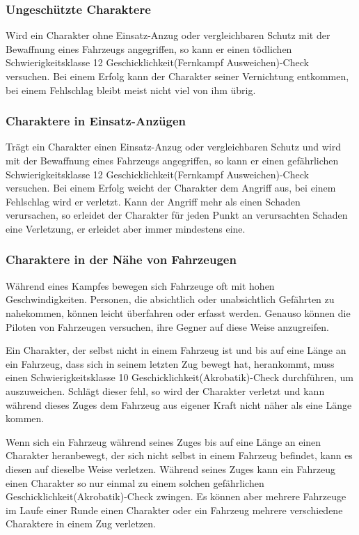 \subsubsection{Ungeschützte Charaktere}
Wird ein Charakter ohne Einsatz-Anzug oder vergleichbaren Schutz mit der Bewaffnung eines Fahrzeugs angegriffen, so kann er einen tödlichen Schwierigkeitsklasse 12 Geschicklichkeit(Fernkampf Ausweichen)-Check versuchen. Bei einem Erfolg kann der Charakter seiner Vernichtung entkommen, bei einem Fehlschlag bleibt meist nicht viel von ihm übrig.
\subsubsection{Charaktere in Einsatz-Anzügen}
Trägt ein Charakter einen Einsatz-Anzug oder vergleichbaren Schutz und wird mit der Bewaffnung eines Fahrzeugs angegriffen, so kann er einen gefährlichen Schwierigkeitsklasse 12 Geschicklichkeit(Fernkampf Ausweichen)-Check versuchen. Bei einem Erfolg weicht der Charakter dem Angriff aus, bei einem Fehlschlag wird er verletzt. Kann der Angriff mehr als einen Schaden verursachen, so erleidet der Charakter für jeden Punkt an verursachten Schaden eine Verletzung, er erleidet aber immer mindestens eine.
\subsubsection{Charaktere in der Nähe von Fahrzeugen}
Während eines Kampfes bewegen sich Fahrzeuge oft mit hohen Geschwindigkeiten. Personen, die absichtlich oder unabsichtlich Gefährten zu nahekommen, können leicht überfahren oder erfasst werden. Genauso können die Piloten von Fahrzeugen versuchen, ihre Gegner auf diese Weise anzugreifen.

Ein Charakter, der selbst nicht in einem Fahrzeug ist und bis auf eine Länge an ein Fahrzeug, dass sich in seinem letzten Zug bewegt hat, herankommt, muss einen Schwierigkeitsklasse 10 Geschicklichkeit(Akrobatik)-Check durchführen, um auszuweichen. Schlägt dieser fehl, so wird der Charakter verletzt und kann während dieses Zuges dem Fahrzeug aus eigener Kraft nicht näher als eine Länge kommen.

Wenn sich ein Fahrzeug während seines Zuges bis auf eine Länge an einen Charakter heranbewegt, der sich nicht selbst in einem Fahrzeug befindet, kann es diesen auf dieselbe Weise verletzen. Während seines Zuges kann ein Fahrzeug einen Charakter so nur einmal zu einem solchen gefährlichen Geschicklichkeit(Akrobatik)-Check zwingen. Es können aber mehrere Fahrzeuge im Laufe einer Runde einen Charakter oder ein Fahrzeug mehrere verschiedene Charaktere in einem Zug verletzen.
